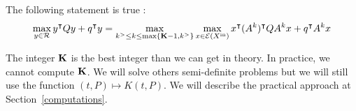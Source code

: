 \documentclass[10pt]{llncs}
\begin{document}
\begin{corollary}
The following statement is true :
 \[
\max_{y\in\mathcal{R}} y^\intercal Q y+q^\intercal y=\max_{k^{>}\leq k\leq \max\{\mathbf{K}-1,k^{>}\}} \max_{x\in \mathcal{E}(X^\mathrm{in})} x^\intercal (A^k)^\intercal Q A^k x+q^\intercal A^k x
\]
\end{corollary}

%
%
The integer $\mathbf{K}$ is the best integer than we can get in theory. In practice, we cannot compute $\mathbf{K}$. We will solve others semi-definite problems but we will still use the function $(t,P)\mapsto K(t,P)$. We will describe the practical approach at Section~\ref{computations}.

\end{document}
